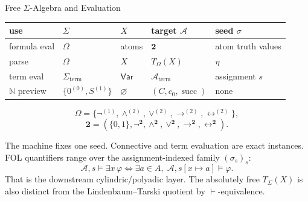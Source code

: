 \begin{modelbox}{Free \(\Sigma\)-Algebra and Evaluation}
\begin{modelinstancesblock}
\begin{center}
\begin{tabularx}{\linewidth}{@{}lXXXX@{}}
\toprule
use & \(\Sigma\) & \(X\) & target \(\mathcal A\) & seed \(\sigma\) \\
\midrule
formula eval &
\(\Omega\) &
atoms &
\(\mathbf 2\) &
atom truth values \\
parse &
\(\Omega\) &
\(X\) &
\(T_{\Omega}(X)\) &
\(\eta\) \\
term eval &
\(\Sigma_{\mathrm{term}}\) &
\(\mathsf{Var}\) &
\(\mathcal A_{\mathrm{term}}\) &
assignment \(s\) \\
\(\mathbb N\) preview &
\(\{0^{(0)},S^{(1)}\}\) &
\(\varnothing\) &
\((C,c_0,\operatorname{succ})\) &
none \\
\bottomrule
\end{tabularx}
\end{center}
\end{modelinstancesblock}

\begin{modelinstancesblock}
\[
  \Omega=\{\neg^{(1)},\wedge^{(2)},\vee^{(2)},\to^{(2)},\leftrightarrow^{(2)}\},
\]
\[
  \mathbf 2=(\{0,1\},\neg^{\mathbf 2},\wedge^{\mathbf 2},
  \vee^{\mathbf 2},\to^{\mathbf 2},\leftrightarrow^{\mathbf 2}).
\]
\end{modelinstancesblock}

\begin{modelboundaryblock}
The machine fixes one seed. Connective and term evaluation are exact
instances. FOL quantifiers range over the assignment-indexed family
\((\sigma_s)_s\):
\[
  \mathcal A,s\models\exists x\,\varphi
  \Longleftrightarrow
  \exists a\in A,\;\mathcal A,s[x\mapsto a]\models\varphi.
\]
That is the downstream cylindric/polyadic layer. The absolutely free
\(T_{\Sigma}(X)\) is also distinct from the Lindenbaum--Tarski quotient by
\(\vdash\)-equivalence.
\end{modelboundaryblock}
\end{modelbox}
